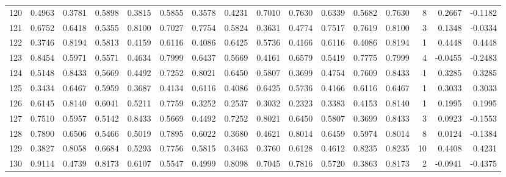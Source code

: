 \begin{tabular}{lrrrrrrrrrrrrrrr}
120 &      0.4963 &  0.3781 &  0.5898 &  0.3815 &  0.5855 &  0.3578 &  0.4231 &  0.7010 &  0.7630 &  0.6339 &   0.5682 &     0.7630 &      8 &                    0.2667 &                    -0.1182 \\
121 &      0.6752 &  0.6418 &  0.5355 &  0.8100 &  0.7027 &  0.7754 &  0.5824 &  0.3631 &  0.4774 &  0.7517 &   0.7619 &     0.8100 &      3 &                    0.1348 &                    -0.0334 \\
122 &      0.3746 &  0.8194 &  0.5813 &  0.4159 &  0.6116 &  0.4086 &  0.6425 &  0.5736 &  0.4166 &  0.6116 &   0.4086 &     0.8194 &      1 &                    0.4448 &                     0.4448 \\
123 &      0.8454 &  0.5971 &  0.5571 &  0.4634 &  0.7999 &  0.6437 &  0.5669 &  0.4161 &  0.6579 &  0.5419 &   0.7775 &     0.7999 &      4 &                   -0.0455 &                    -0.2483 \\
124 &      0.5148 &  0.8433 &  0.5669 &  0.4492 &  0.7252 &  0.8021 &  0.6450 &  0.5807 &  0.3699 &  0.4754 &   0.7609 &     0.8433 &      1 &                    0.3285 &                     0.3285 \\
125 &      0.3434 &  0.6467 &  0.5959 &  0.3687 &  0.4134 &  0.6116 &  0.4086 &  0.6425 &  0.5736 &  0.4166 &   0.6116 &     0.6467 &      1 &                    0.3033 &                     0.3033 \\
126 &      0.6145 &  0.8140 &  0.6041 &  0.5211 &  0.7759 &  0.3252 &  0.2537 &  0.3032 &  0.2323 &  0.3383 &   0.4153 &     0.8140 &      1 &                    0.1995 &                     0.1995 \\
127 &      0.7510 &  0.5957 &  0.5142 &  0.8433 &  0.5669 &  0.4492 &  0.7252 &  0.8021 &  0.6450 &  0.5807 &   0.3699 &     0.8433 &      3 &                    0.0923 &                    -0.1553 \\
128 &      0.7890 &  0.6506 &  0.5466 &  0.5019 &  0.7895 &  0.6022 &  0.3680 &  0.4621 &  0.8014 &  0.6459 &   0.5974 &     0.8014 &      8 &                    0.0124 &                    -0.1384 \\
129 &      0.3827 &  0.8058 &  0.6684 &  0.5293 &  0.7756 &  0.5815 &  0.3463 &  0.3760 &  0.6128 &  0.4612 &   0.8235 &     0.8235 &     10 &                    0.4408 &                     0.4231 \\
130 &      0.9114 &  0.4739 &  0.8173 &  0.6107 &  0.5547 &  0.4999 &  0.8098 &  0.7045 &  0.7816 &  0.5720 &   0.3863 &     0.8173 &      2 &                   -0.0941 &                    -0.4375 \\

\end{tabular}
